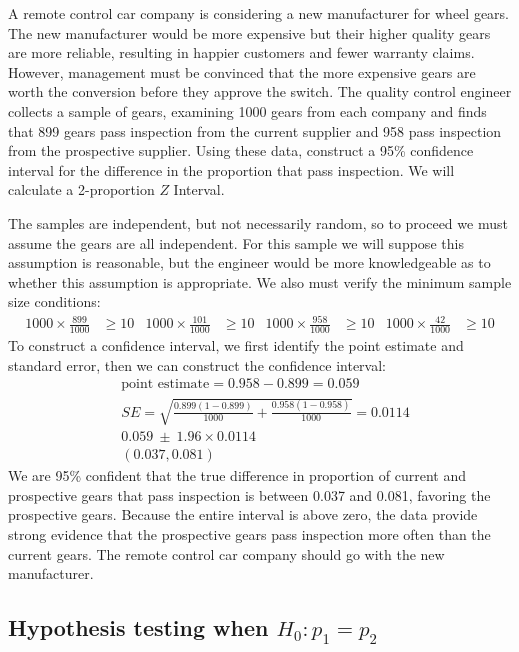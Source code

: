 \begin{example}{A remote control car company is considering a new manufacturer for wheel gears. The new manufacturer would be more expensive but their higher quality gears are more reliable, resulting in happier customers and fewer warranty claims. However, management must be convinced that the more expensive gears are worth the conversion before they approve the switch. The quality control engineer collects a sample of gears, examining 1000 gears from each company and finds that 899 gears pass inspection from the current supplier and 958 pass inspection from the prospective supplier. Using these data, construct a 95\% confidence interval for the difference in the proportion that pass inspection.}
We will calculate a 2-proportion $Z$ Interval.

The samples are independent, but not necessarily random, so to proceed we must assume the gears are all independent. For this sample we will suppose this assumption is reasonable, but the engineer would be more knowledgeable as to whether this assumption is appropriate. We also must verify the minimum sample size conditions:
\begin{align*}
1000 \times \frac{899}{1000} &\ge 10
	&1000 \times \frac{101}{1000} &\ge 10
	&1000 \times \frac{958}{1000} &\ge 10
	&1000 \times \frac{42}{1000} &\ge 10
\end{align*}
To construct a confidence interval, we first identify the point estimate and standard error, then we can construct the confidence interval:
\begin{align*}
&\text{point estimate} = 0.958 - 0.899 = 0.059 \\
&SE = \sqrt{\frac{0.899(1-0.899)}{1000} +
			\frac{0.958(1-0.958)}{1000}}
	= 0.0114 \\
&0.059\ \pm\ 1.96 \times 0.0114 \\
&(0.037, 0.081)
\end{align*}
We are 95\% confident that the true difference in proportion of current and prospective gears that pass inspection is between 0.037 and 0.081, favoring the prospective gears. Because the entire interval is above zero, the data provide strong evidence that the prospective gears pass inspection more often than the current gears. The remote control car company should go with the new manufacturer.
\end{example}


\subsection{Hypothesis testing when $H_0: p_1 = p_2$}
\label{pooledHTForProportionsSection}

